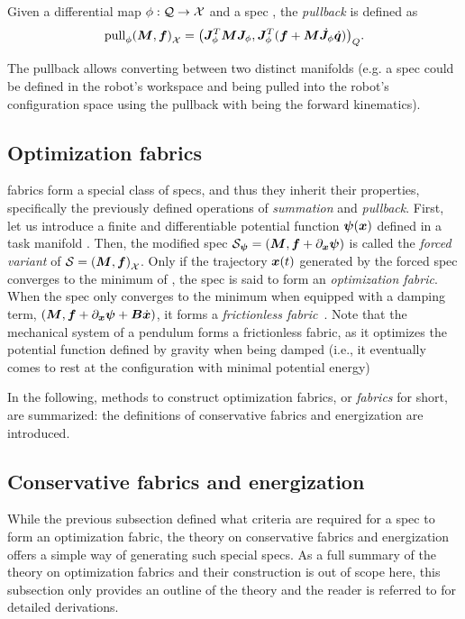 Given a differential map $\phi: \mathcal{Q}\rightarrow\mathcal{X}$ and a spec
\spec{}, the \textit{pullback} is defined as
\begin{equation}
  \textrm{pull}_{\phi}{\left(\bm{M},\bm{f}\right)_{\mathcal{X}}} = {\left(\bm{J}^T_{\phi}\bm{M}\bm{J}_{\phi}, \bm{J}^T_{\phi}(\bm{f}+\bm{M}\dot{\bm{J}}_{\phi}\dot{\bm{q}})\right)}_{Q}.
  \label{eq:pullback}
\end{equation}

The pullback allows converting between two distinct
manifolds (e.g. a spec could be defined in the robot's
workspace and being pulled into the robot's configuration
space using the pullback with \map{} being the forward
kinematics).

\subsection{Optimization fabrics}%
\label{sub:optimization_fabrics}

\ac{fabrics} form a special class of specs, and thus they inherit their properties,
specifically the previously defined operations of \textit{summation} and \textit{pullback}.
First, let us introduce a finite and differentiable potential
function $\bm{\psi}(\bm{x})$ defined in a task manifold \X{}. 
Then, the modified spec $\mathcal{S}_{\bm{\psi}} = \left(\bm{M},\bm{f} + \partial_{\bm{x}}\bm{\psi}\right)$
is called the \textit{forced variant} of $\mathcal{S} = \left(\bm{M},\bm{f}\right)_{\mathcal{X}}$.
Only if the trajectory $\bm{x}(t)$ generated by the forced spec converges to the minimum of \forc{}, 
the spec is said to form an \textit{optimization fabric}.
When the spec only converges to the minimum when equipped with a damping term,
$\left(\bm{M},\bm{f} + \partial_{\bm{x}}\bm{\psi} + \bm{B}\dot{\bm{x}}\right)$, 
it forms a \textit{frictionless fabric}~\cite[Definition 4.4]{Ratliff2020}. 
Note that the mechanical system of a pendulum forms a frictionless fabric, as it optimizes
the potential function defined by gravity when being damped (i.e., it eventually comes to
rest at the configuration with minimal potential energy)

In the following, methods to construct optimization fabrics, or \textit{fabrics} for
short, are summarized: the definitions of conservative fabrics and energization are
introduced.

\subsection{Conservative fabrics and energization}%
\label{sub:conservative_fabrics_and_energization}

While the previous subsection defined what criteria are required for a spec to form
an optimization fabric, the theory on conservative fabrics and energization 
offers a simple way of generating such special specs. As a full summary of the theory
on optimization fabrics and their construction is out of scope here, this
subsection only provides an outline of the theory and the reader is referred to 
\cite{Ratliff2021,Wyk2022} for detailed derivations.

